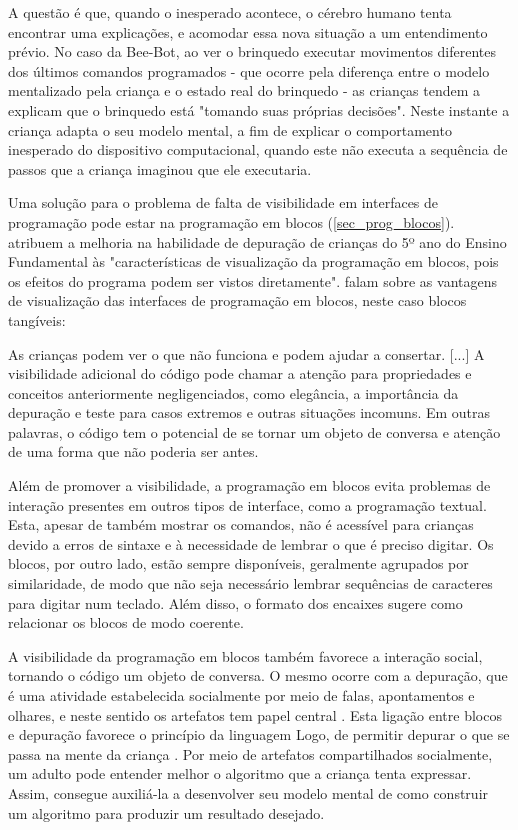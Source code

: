 A questão é que, quando o inesperado acontece, o cérebro humano tenta encontrar uma explicações, e acomodar essa nova situação a um entendimento prévio. No caso da Bee-Bot, ao ver o brinquedo executar movimentos diferentes dos últimos comandos programados - que ocorre pela diferença entre o modelo mentalizado pela criança e o estado real do brinquedo - as crianças tendem a explicam que o brinquedo está "tomando suas próprias decisões". Neste instante a criança adapta o seu modelo mental, a fim de explicar o comportamento inesperado do dispositivo computacional, quando este não executa a sequência de passos que a criança imaginou que ele executaria. 

Uma solução para o problema de falta de visibilidade em interfaces de programação pode estar na programação em blocos (\autoref{sec_prog_blocos}).  atribuem a melhoria na habilidade de depuração de crianças do 5º ano do Ensino Fundamental às "características de visualização da programação em blocos, pois os efeitos do programa podem ser vistos diretamente".  falam sobre as vantagens de visualização das interfaces de programação em blocos, neste caso blocos tangíveis:

\begin{citacao}
As crianças podem ver o que não funciona e podem ajudar a consertar. [...] A visibilidade adicional do código pode chamar a atenção para propriedades e conceitos anteriormente negligenciados, como elegância, a importância da depuração e teste para casos extremos e outras situações incomuns. Em outras palavras, o código tem o potencial de se tornar um objeto de conversa e atenção de uma forma que não poderia ser antes. \cite[p.14, tradução nossa]{bers_coding_2019}
\end{citacao}

Além de promover a visibilidade, a programação em blocos evita problemas de interação presentes em outros tipos de interface, como a programação textual.
Esta, apesar de também mostrar os comandos, não é acessível para crianças devido a erros de sintaxe e à necessidade de lembrar o que é preciso digitar. Os blocos, por outro lado, estão sempre disponíveis, geralmente agrupados por similaridade, de modo que não seja necessário lembrar sequências de caracteres para digitar num teclado. Além disso, o formato dos encaixes sugere como relacionar os blocos de modo coerente. 

A visibilidade da programação em blocos também favorece a interação social, tornando o código um objeto de conversa. O mesmo ocorre com a depuração, que é uma atividade estabelecida socialmente por meio de falas, apontamentos e olhares, e neste sentido os artefatos tem papel central \cite{heikkila_debugging_2018}. Esta ligação entre blocos e depuração favorece o princípio da linguagem Logo, de permitir depurar o que se passa na mente da criança \cite{solomon_history_2020}. Por meio de artefatos compartilhados socialmente, um adulto pode entender melhor o algoritmo que a criança tenta expressar. Assim, consegue auxiliá-la a desenvolver seu modelo mental de como construir um algoritmo para produzir um resultado desejado.

